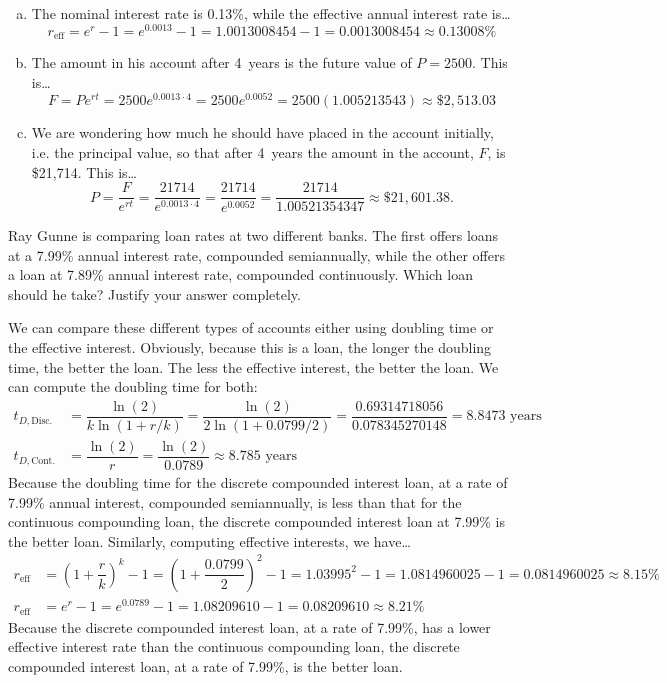 \documentclass[11pt,letterpaper]{article}
\begin{document}
\begin{enumerate}[(a)]
\item The nominal interest rate is 0.13\%, while the effective annual interest rate is\dots
	\[
	r_{\text{eff}}= e^r - 1= e^{0.0013} - 1= 1.0013008454 - 1= 0.0013008454 \approx 0.13008\%
	\] \pspace

\item The amount in his account after 4~years is the future value of $P= 2500$. This is\dots
	\[
	F= Pe^{rt}= 2500 e^{0.0013 \cdot 4}= 2500 e^{0.0052}= 2500(1.005213543) \approx \$2,513.03
	\] \pspace

\item We are wondering how much he should have placed in the account initially, i.e. the principal value, so that after 4~years the amount in the account, $F$, is \$21,714. This is\dots
	\[
	P= \dfrac{F}{e^{rt}}= \dfrac{21714}{e^{0.0013 \cdot 4}}= \dfrac{21714}{e^{0.0052}}= \dfrac{21714}{1.00521354347} \approx \$21,601.38.
	\] 
\end{enumerate}



\newpage



 Ray Gunne is comparing loan rates at two different banks. The first offers loans at a 7.99\% annual interest rate, compounded semiannually, while the other offers a loan at 7.89\% annual interest rate, compounded continuously. Which loan should he take? Justify your answer completely. \pspace

\sol We can compare these different types of accounts either using doubling time or the effective interest. Obviously, because this is a loan, the longer the doubling time, the better the loan. The less the effective interest, the better the loan. We can compute the doubling time for both: \pspace
	\[
	\begin{aligned}
	t_{D, \text{Disc.}}&= \dfrac{\ln(2)}{k \ln(1 + r/k)}= \dfrac{\ln(2)}{2 \ln(1 + 0.0799/2)}= \dfrac{0.69314718056}{0.078345270148}= 8.8473 \text{ years} \\[0.3cm]
	t_{D, \text{Cont.}}&= \dfrac{\ln(2)}{r}= \dfrac{\ln(2)}{0.0789} \approx 8.785 \text{ years}
	\end{aligned}
	\] \pspace
Because the doubling time for the discrete compounded interest loan, at a rate of 7.99\% annual interest, compounded semiannually, is less than that for the continuous compounding loan, the discrete compounded interest loan at 7.99\% is the better loan. Similarly, computing effective interests, we have\dots \pspace
	\[
	\begin{aligned}
	r_{\text{eff}}&= \left(1 + \dfrac{r}{k} \right)^k - 1= \left(1 + \dfrac{0.0799}{2} \right)^2 - 1= 1.03995^2 - 1= 1.0814960025 - 1= 0.0814960025 \approx 8.15\% \\[0.3cm]
	r_{\text{eff}}&= e^r - 1= e^{0.0789} - 1= 1.08209610 - 1= 0.08209610 \approx 8.21\%
	\end{aligned}
	\] \pspace
Because the discrete compounded interest loan, at a rate of 7.99\%, has a lower effective interest rate than the continuous compounding loan, the discrete compounded interest loan, at a rate of 7.99\%, is the better loan. 
\end{document}
